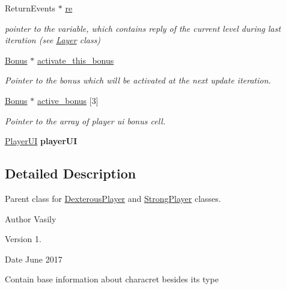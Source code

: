 \begin{DoxyCompactItemize}
\mbox{\label{class_player_a652a51b511e40c14cd43c906693670f6}} 
Return\+Events $\ast$ \hyperlink{class_player_a652a51b511e40c14cd43c906693670f6}{re}
\begin{DoxyCompactList}\small\item\em pointer to the variable, which contains reply of the current level during last iteration (see \hyperlink{class_layer}{Layer} class) \end{DoxyCompactList}\item 
\mbox{\label{class_player_ac1b10a27f5fac807cd2a2ff00018b18d}} 
\hyperlink{class_bonus}{Bonus} $\ast$ \hyperlink{class_player_ac1b10a27f5fac807cd2a2ff00018b18d}{activate\+\_\+this\+\_\+bonus}
\begin{DoxyCompactList}\small\item\em Pointer to the bonus which will be activated at the next update iteration. \end{DoxyCompactList}\item 
\mbox{\label{class_player_aa9320da45054e6196476c46b9b0ac794}} 
\hyperlink{class_bonus}{Bonus} $\ast$ \hyperlink{class_player_aa9320da45054e6196476c46b9b0ac794}{active\+\_\+bonus} \mbox{[}3\mbox{]}
\begin{DoxyCompactList}\small\item\em Pointer to the array of player ui bonus cell. \end{DoxyCompactList}\item 
\mbox{\label{class_player_a31637dcf493a77b73258e87641b339d4}} 
\hyperlink{class_player_u_i}{Player\+UI} {\bfseries player\+UI}
\end{DoxyCompactItemize}


\subsection{Detailed Description}
Parent class for \hyperlink{class_dexterous_player}{Dexterous\+Player} and \hyperlink{class_strong_player}{Strong\+Player} classes. 

\begin{DoxyAuthor}{Author}
Vasily 
\end{DoxyAuthor}
\begin{DoxyVersion}{Version}
1. 
\end{DoxyVersion}
\begin{DoxyDate}{Date}
June 2017
\end{DoxyDate}
Contain base information about characret besides its type 

